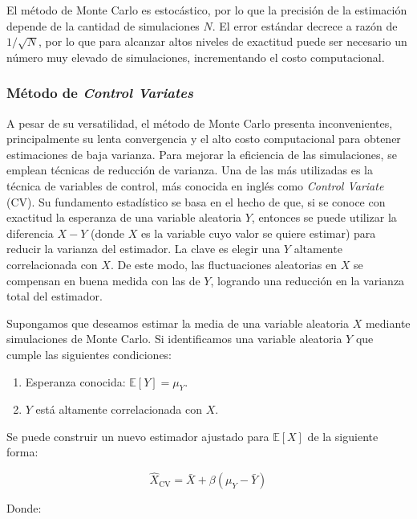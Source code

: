 \documentclass[11pt,a4paper,spanish]{article}
\numberwithin{equation}{section} %
\begin{document}
    El método de Monte Carlo es estocástico, por lo que la precisión de la estimación depende de la cantidad de simulaciones $N$. El error estándar decrece a razón de $1/\sqrt{N}$, por lo que para alcanzar altos niveles de exactitud puede ser necesario un número muy elevado de simulaciones, incrementando el costo computacional.

\subsubsection{Método de \textit{Control Variates}} \label{subsubsec:metodo-monte-carlo-cv}

A pesar de su versatilidad, el método de Monte Carlo presenta inconvenientes, principalmente su lenta convergencia y el alto costo computacional para obtener estimaciones de baja varianza. Para mejorar la eficiencia de las simulaciones, se emplean técnicas de reducción de varianza. Una de las más utilizadas es la técnica de variables de control, más conocida en inglés como \textit{Control Variate} (CV). Su fundamento estadístico se basa en el hecho de que, si se conoce con exactitud la esperanza de una variable aleatoria \( Y \), entonces se puede utilizar la diferencia \( X - Y \) (donde \( X \) es la variable cuyo valor se quiere estimar) para reducir la varianza del estimador. La clave es elegir una \( Y \) altamente correlacionada con \( X \). De este modo, las fluctuaciones aleatorias en \( X \) se compensan en buena medida con las de \( Y \), logrando una reducción en la varianza total del estimador.


Supongamos que deseamos estimar la media de una variable aleatoria \( X \) mediante simulaciones de Monte Carlo. Si identificamos una variable aleatoria \( Y \) que cumple las siguientes condiciones:

\begin{enumerate}
    \item Esperanza conocida: \( \mathbb{E}[Y] = \mu_Y \).
    \item \( Y \) está altamente correlacionada con \( X \).
\end{enumerate}

Se puede construir un nuevo estimador ajustado para \( \mathbb{E}[X] \) de la siguiente forma:

\begin{equation}
\hat{X}_{\text{CV}} = \bar{X} + \beta (\mu_Y - \bar{Y})
\end{equation}

Donde:
\end{document}

